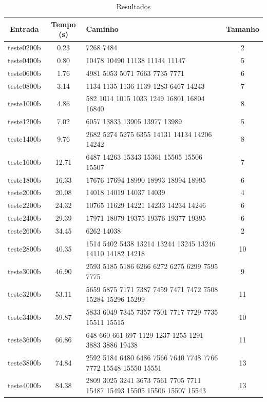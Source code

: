 \documentclass[12pt]{article}
\begin{document}
\begin{table}[h]
\caption{Resultados}
\label{tab:resultados-1}
\begin{tabular}{c | c || p{8cm} | c}
  Entrada & Tempo (s) & Caminho & Tamanho \\
  \hline \hline
  teste0200b & 0.23 & 7268 7484 & 2 \\
  \hline
  teste0400b & 0.80 & 10478 10490 11138 11144 11147 & 5 \\
  \hline
  teste0600b & 1.76 & 4981 5053 5071 7663 7735 7771 & 6 \\
  \hline
  teste0800b & 3.14 & 1134 1135 1136 1139 1283 6467 14243 & 7 \\
  \hline
  teste1000b & 4.86 & 582 1014 1015 1033 1249 16801 16804 16840 & 8 \\
  \hline
  teste1200b & 7.02 & 6057 13833 13905 13977 13989 & 5 \\
  \hline
  teste1400b & 9.76 & 2682 5274 5275 6355 14131 14134 14206 14242 & 8 \\
  \hline
  teste1600b & 12.71 & 6487 14263 15343 15361 15505 15506 15507 & 7 \\
  \hline
  teste1800b & 16.33 & 17676 17694 18990 18993 18994 18995 & 6 \\
  \hline
  teste2000b & 20.08 & 14018 14019 14037 14039 & 4 \\
  \hline
  teste2200b & 24.32 & 10765 11629 14221 14233 14234 14246 & 6 \\
  \hline
  teste2400b & 29.39 & 17971 18079 19375 19376 19377 19395 & 6 \\
  \hline
  teste2600b & 34.45 & 6262 14038 & 2 \\
  \hline
  teste2800b & 40.35 & 1514 5402 5438 13214 13244 13245 13246 14110 14182 14218 & 10 \\
  \hline
  teste3000b & 46.90 & 2593 5185 5186 6266 6272 6275 6299 7595 7775 & 9 \\
  \hline
  teste3200b & 53.11 & 5659 5875 7171 7387 7459 7471 7472 7508 15284 15296 15299 & 11 \\
  \hline
  teste3400b & 59.87 & 5833 6049 7345 7357 7501 7717 7729 7735 15511 15515 & 10 \\
  \hline
  teste3600b & 66.86 & 648 660 661 697 1129 1237 1255 1291 3883 3886 19438 & 11 \\
  \hline
  teste3800b & 74.84 & 2592 5184 6480 6486 7566 7640 7748 7766 7772 15548 15550 15551 & 13 \\
  \hline
  teste4000b & 84.38 & 2809 3025 3241 3673 7561 7705 7711 15487 15493 15505 15506 15507 15543 & 13 \\

\end{tabular}
\end{table}
\end{document}
